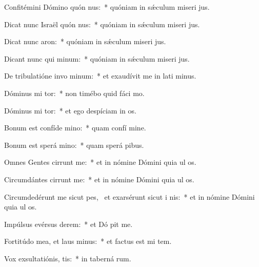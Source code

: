\item Confitémini Dómino quón nus:~* quóniam in sǽculum miseri jus.
\item Dicat nunc Israël quón nus:~* quóniam in sǽculum miseri jus.
\item Dicat nunc  aron:~* quóniam in sǽculum miseri jus.
\item Dicant nunc qui  minum:~* quóniam in sǽculum miseri jus.
\item De tribulatióne invo minum:~* et exaudívit me in lati minus.
\item Dóminus mi tor:~* non timébo quid fáci  mo.
\item Dóminus mi tor:~* et ego despíciam in os.
\item Bonum est confíde  mino:~* quam confí  mine.
\item Bonum est sperá  mino:~* quam sperá  pibus.
\item Omnes Gentes cirrunt me:~* et in nómine Dómini quia ul   os.
\item Circumdántes cirrunt me:~* et in nómine Dómini quia ul   os.
\item Circumdedérunt me sicut pes,~\pscross{} et exarsérunt sicut i  nis:~* et in nómine Dómini quia ul   os.
\item Impúlsus evérsus   derem:~* et Dó pit me.
\item Fortitúdo mea, et laus  minus:~* et factus est mi  tem.
\item Vox exsultatiónis,  tis:~* in taberná rum.
